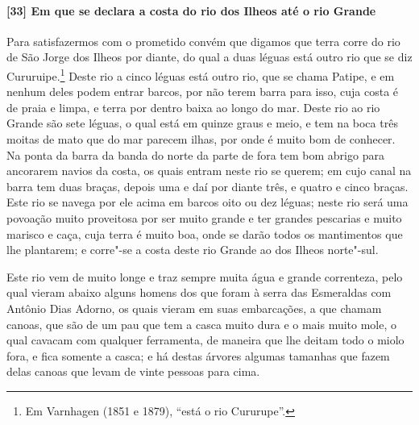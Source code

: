 \begin{linenumbers}
\paragraph{[33] Em que se declara a costa do rio dos Ilheos até o rio Grande} \quad
Para satisfazermos com o prometido convém que digamos que terra corre do rio de São Jorge
dos Ilheos por diante, do qual a duas léguas está outro rio que se diz
Cururuipe.\footnote{ Em Varnhagen (1851 e 1879), ``está o rio Cururupe''.} Deste rio a
cinco léguas está outro rio, que se chama Patipe, e em nenhum deles podem entrar barcos,
por não terem barra para isso, cuja costa é de praia e limpa, e terra por dentro baixa ao
longo do mar. Deste rio ao rio Grande são sete léguas, o qual está em quinze graus e meio,
e tem na boca três moitas de mato que do mar parecem ilhas, por onde é muito bom de
conhecer. Na ponta da barra da banda do norte da parte de fora tem bom abrigo para
ancorarem navios da costa, os quais entram neste rio se querem; em cujo canal na barra tem
duas braças, depois uma e daí por diante três, e quatro e cinco braças. Este rio se navega
por ele acima em barcos oito ou dez léguas; neste rio será uma povoação muito proveitosa
por ser muito grande e ter grandes pescarias e muito marisco e caça, cuja terra é muito
boa, onde se darão todos os mantimentos que lhe plantarem; e corre"-se a costa deste rio
Grande ao dos Ilheos norte"-sul.

Este rio vem de muito longe e traz sempre muita água e grande correnteza, pelo qual vieram
abaixo alguns homens dos que foram à serra das Esmeraldas com Antônio Dias Adorno, os
quais vieram em suas embarcações, a que chamam canoas, que são de um pau que tem a casca
muito dura e o mais muito mole, o qual cavacam com qualquer ferramenta, de maneira que lhe
deitam todo o miolo fora, e fica somente a casca; e há destas árvores algumas tamanhas que
fazem delas canoas que levam de vinte pessoas para cima.


\end{linenumbers}
